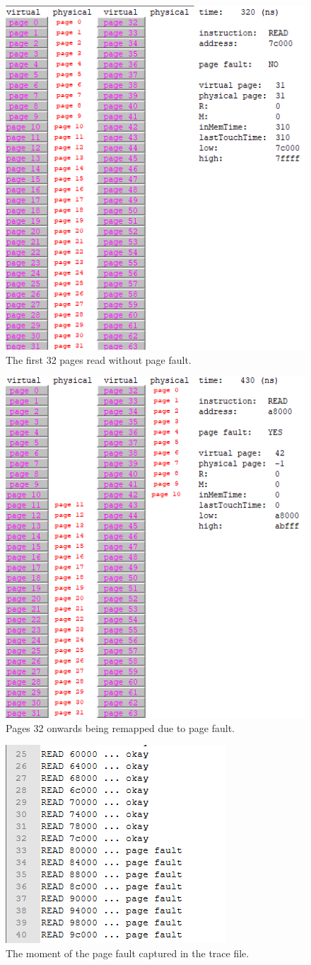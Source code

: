 \documentclass{article}
\begin{document}
	\begin{figure}[h]
		\begin{center}
			\includegraphics[width=0.4\linewidth]{screenshot1.png}
			\caption{The first 32 pages read without page fault.}
			\label{fig:topview}
		\end{center}
	\end{figure}
	\begin{figure}[h]
		\begin{center}
			\includegraphics[width=0.4\linewidth]{screenshot2.png}
			\caption{Pages 32 onwards being remapped due to page fault.}
			\label{fig:topview}
		\end{center}
	\end{figure}
	\begin{figure}[h]
		\begin{center}
			\includegraphics[width=0.5\linewidth]{screenshot3.png}
			\caption{The moment of the page fault captured in the trace file.}
			\label{fig:topview}
		\end{center}
	\end{figure}
\end{document}
